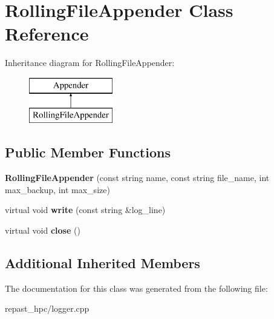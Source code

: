 \hypertarget{class_rolling_file_appender}{\section{Rolling\-File\-Appender Class Reference}
\label{class_rolling_file_appender}
}
Inheritance diagram for Rolling\-File\-Appender\-:\begin{figure}[H]
\begin{center}
\leavevmode
\includegraphics[height=2.000000cm]{class_rolling_file_appender}
\end{center}
\end{figure}
\subsection*{Public Member Functions}
\begin{DoxyCompactItemize}
\item 
\hypertarget{class_rolling_file_appender_ad064edb9a9a56abe1bb8d2c99551c32f}{{\bfseries Rolling\-File\-Appender} (const string name, const string file\-\_\-name, int max\-\_\-backup, int max\-\_\-size)}\label{class_rolling_file_appender_ad064edb9a9a56abe1bb8d2c99551c32f}

\item 
\hypertarget{class_rolling_file_appender_a8e4a0abe8891bd2e28aa8b39e92c0435}{virtual void {\bfseries write} (const string \&log\-\_\-line)}\label{class_rolling_file_appender_a8e4a0abe8891bd2e28aa8b39e92c0435}

\item 
\hypertarget{class_rolling_file_appender_a123c83a1000ca9cd0f40fe747c816bcc}{virtual void {\bfseries close} ()}\label{class_rolling_file_appender_a123c83a1000ca9cd0f40fe747c816bcc}

\end{DoxyCompactItemize}
\subsection*{Additional Inherited Members}


The documentation for this class was generated from the following file\-:\begin{DoxyCompactItemize}
\item 
repast\-\_\-hpc/logger.\-cpp\end{DoxyCompactItemize}
